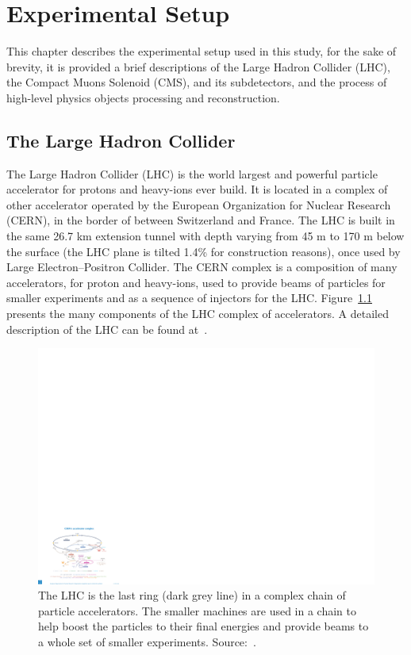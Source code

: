 
\chapter{Experimental Setup}

This chapter describes the experimental setup used in this study, for the sake of brevity, it is provided a brief descriptions of the Large Hadron Collider (LHC), the Compact Muons Solenoid (CMS), and its subdetectors, and the process of high-level physics objects processing and reconstruction.

\section{The Large Hadron Collider}

The Large Hadron Collider (LHC) is the world largest and powerful particle accelerator for protons and heavy-ions ever build. It is located in a complex of other accelerator operated by the European Organization for Nuclear Research (CERN), in the border of between Switzerland and France. The LHC is built in the same 26.7 km extension tunnel with depth varying from 45 m to 170 m below the surface (the LHC plane is tilted 1.4\% for construction reasons), once used by Large Electron–Positron Collider. The CERN complex is a composition of many accelerators, for proton and heavy-ions, used to provide beams of particles for smaller experiments and as a sequence of injectors for the LHC. Figure~\ref{lhc_complex} presents the many components of the LHC complex of accelerators. A detailed description of the LHC can be found at~\cite{Evans:2008zzb, Bruning:782076, Bruning:815187, Benedikt:823808}.

\begin{figure}[htbp]
    \centering
    \includegraphics[width=\textwidth]{figures_and_tables/experimental_setup/lhc_complex.pdf}
    \caption{The LHC is the last ring (dark grey line) in a complex chain of particle accelerators. The smaller machines are used in a chain to help boost the particles to their final energies and provide beams to a whole set of smaller experiments. Source:~\cite{lhc_complex}.}
    \label{lhc_complex}
\end{figure}

